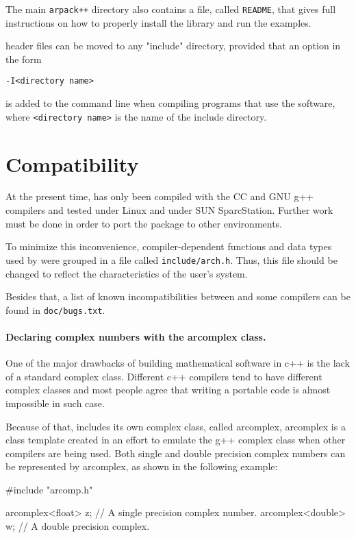 The main \texttt{arpack++} directory also contains a file, called \texttt{README}, that gives full instructions on how to properly install the library and run the examples.

\ARPP{} header files can be moved to any "include" directory, provided that an option in the form
\begin{verbatim}
-I<directory name>
\end{verbatim}

is added to the command line when compiling programs that use the software, where \texttt{<directory name>} is the name of the include directory.

\section{Compatibility}

At the present time, \ARPP{} has only been compiled with the CC and GNU g++ compilers and tested under Linux and under SUN SparcStation. Further work must be done in order to port the package to other environments.

To minimize this inconvenience, compiler-dependent functions and data types used by \ARPP{} were grouped in a file called \texttt{include/arch.h}. Thus, this file should be changed to reflect the characteristics of the user’s system.

Besides that, a list of known incompatibilities between \ARPP{} and some compilers can be found in \texttt{doc/bugs.txt}.

\paragraph{Declaring complex numbers with the arcomplex class.}

One of the major drawbacks of building mathematical software in c++ is the lack of a standard complex class. Different c++ compilers tend to have different complex classes and most people agree that writing a portable code is almost impossible in such case.

Because of that, \ARPP{} includes its own complex class, called arcomplex, arcomplex is a class template created in an effort to emulate the g++ complex class when other compilers are being used. Both single and double precision complex numbers can be represented by arcomplex, as shown in the following example:

\begin{cppcode}
#include "arcomp.h"

arcomplex<float>  z;  // A single precision complex number.
arcomplex<double> w;  // A double precision complex.
\end{cppcode}

